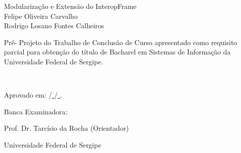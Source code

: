 \newpage
\thispagestyle{empty}
\begin{titlepage}
    \begin{center}
        {\LARGE Modularização e Extensão do InteropFrame}\\[2.3cm]
        {\Large Felipe Oliveira Carvalho \\ Rodrigo Losano Fontes Calheiros} \\[1.5cm]
        \hspace{.45\textwidth} %
        \begin{minipage}{.5\textwidth}
            \singlespacing
                Pré- Projeto do Trabalho de Conclus\~ao de Curso apresentado como requisito parcial para obten\c c\~ao do t\'itulo de Bacharel em Sistemas de Informação da Universidade Federal de Sergipe. \\

            \onehalfspacing
        \end{minipage}\\[2.5cm]

        \centerline{Aprovado em: \underline{ }\underline{ }\underline{ }\underline{ }\underline{ }\underline{ } /\underline{ }\underline{ }\underline{ }\underline{ }\underline{ }\underline{ } /\underline{ }\underline{ }\underline{ }\underline{ }\underline{ }\underline{ }.}
        \centerline{}
        \centerline{}
        \centerline{Banca Examinadora:}

        \centerline{}
        \centerline{\underline{ }\underline{ }\underline{ }\underline{ }\underline{ }\underline{ }\underline{ }\underline{ }\underline{ }\underline{ }\underline{ }\underline{ }\underline{ }\underline{ }\underline{ }\underline{ }\underline{ }\underline{ }\underline{ }\underline{ }\underline{ }\underline{ }\underline{ }\underline{ }\underline{ }\underline{ }\underline{ }\underline{ }\underline{ }\underline{ }\underline{ }\underline{ }\underline{ }\underline{ }\underline{ }\underline{ }\underline{ }\underline{ }\underline{ }\underline{ }\underline{ }\underline{ }\underline{ }\underline{ }\underline{ }\underline{ }\underline{ }\underline{ }\underline{ }\underline{ }\underline{ }\underline{ }\underline{ }\underline{ }\underline{ }\underline{ }\underline{ }\underline{ }\underline{ }\underline{ }\underline{ }\underline{ }\underline{ }\underline{ }\underline{ }\underline{ }\underline{ }\underline{ }\underline{ }\underline{ }\underline{ }\underline{ }\underline{ }\underline{ }\underline{ }\underline{ }\underline{ }}
        \centerline{Prof. Dr. Tarc\'isio da Rocha (Orientador)}
        \centerline{Universidade Federal de Sergipe}
        \centerline{}


\end{center}
\end{titlepage}
